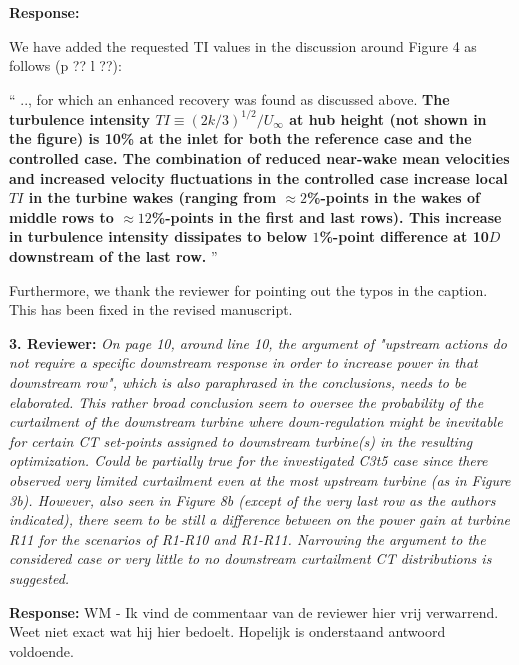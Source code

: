 \documentclass[]{article}
\begin{document}
\textbf{Response: }

We have added the requested TI values in the discussion around Figure 4 as follows (p ?? l ??):

``
.., for which an enhanced recovery was found as discussed above. \textbf{The turbulence intensity $TI \equiv (2k/3  )^{1/2}/U_\infty$ at hub height (not shown in the figure) is 10\% at the inlet for both the reference case and the controlled case. The combination of reduced near-wake mean velocities and increased velocity fluctuations in the controlled case increase local $TI$ in the turbine wakes (ranging from $\approx 2$\%-points in the wakes of middle rows to $\approx 12$\%-points in the first and last rows). This increase in turbulence intensity dissipates to below $1$\%-point difference at 10$D$ downstream of the last row.}
''

Furthermore, we thank the reviewer for pointing out the typos in the caption. This has been fixed in the revised manuscript.

\dotfill

\textbf{3. Reviewer: } \textit{On page 10, around line 10, the argument of "upstream actions do not require a
	specific downstream response in order to increase power in that downstream row",
	which is also paraphrased in the conclusions, needs to be elaborated. This rather
	broad conclusion seem to oversee the probability of the curtailment of the downstream
	turbine where down-regulation might be inevitable for certain CT set-points assigned
	to downstream turbine(s) in the resulting optimization. Could be partially true for the
	investigated C3t5 case since there observed very limited curtailment even at the most
	upstream turbine (as in Figure 3b). However, also seen in Figure 8b (except of the
	very last row as the authors indicated), there seem to be still a difference between on
	the power gain at turbine R11 for the scenarios of R1-R10 and R1-R11. Narrowing the argument to the considered case or very little to no downstream curtailment CT
	distributions is suggested.}

\textbf{Response: } WM - Ik vind de commentaar van de reviewer hier vrij verwarrend. Weet niet exact wat hij hier bedoelt. Hopelijk is onderstaand antwoord voldoende. 
\end{document}
